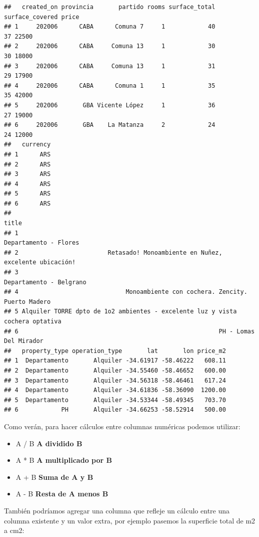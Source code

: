 \documentclass[
  spanish,
]{book}
\providecommand{\tightlist}{%
  \setlength{\itemsep}{0pt}\setlength{\parskip}{0pt}}
\begin{document}
\begin{verbatim}
##   created_on provincia       partido rooms surface_total surface_covered price
## 1     202006      CABA      Comuna 7     1            40              37 22500
## 2     202006      CABA     Comuna 13     1            30              30 18000
## 3     202006      CABA     Comuna 13     1            31              29 17900
## 4     202006      CABA      Comuna 1     1            35              35 42000
## 5     202006       GBA Vicente López     1            36              27 19000
## 6     202006       GBA    La Matanza     2            24              24 12000
##   currency
## 1      ARS
## 2      ARS
## 3      ARS
## 4      ARS
## 5      ARS
## 6      ARS
##                                                                           title
## 1                                                         Departamento - Flores
## 2                         Retasado! Monoambiente en Nuñez, excelente ubicación!
## 3                                                       Departamento - Belgrano
## 4                              Monoambiente con cochera. Zencity. Puerto Madero
## 5 Alquiler TORRE dpto de 1o2 ambientes - excelente luz y vista cochera optativa
## 6                                                        PH - Lomas Del Mirador
##   property_type operation_type       lat       lon price_m2
## 1  Departamento       Alquiler -34.61917 -58.46222   608.11
## 2  Departamento       Alquiler -34.55460 -58.46652   600.00
## 3  Departamento       Alquiler -34.56318 -58.46461   617.24
## 4  Departamento       Alquiler -34.61836 -58.36090  1200.00
## 5  Departamento       Alquiler -34.53344 -58.49345   703.70
## 6            PH       Alquiler -34.66253 -58.52914   500.00
\end{verbatim}

Como verán, para hacer cálculos entre columnas numéricas podemos utilizar:

\begin{itemize}
\tightlist
\item
  A / B \textbf{A dividido B}
\item
  A * B \textbf{A multiplicado por B}
\item
  A + B \textbf{Suma de A y B}
\item
  A - B \textbf{Resta de A menos B}
\end{itemize}

También podríamos agregar una columna que refleje un cálculo entre una columna existente y un valor extra, por ejemplo pasemos la superficie total de m2 a cm2:
\end{document}
